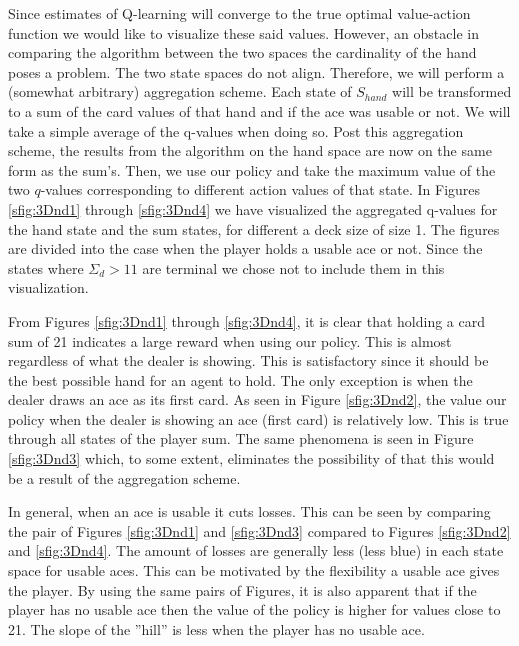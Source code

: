 Since estimates of Q-learning will converge to the true optimal value-action function we would like to visualize these said values. However, an obstacle in comparing the algorithm between the two spaces the cardinality of the hand poses a problem. The two state spaces do not align. Therefore, we will perform a (somewhat arbitrary) aggregation scheme. Each state of $S_{hand}$ will be transformed to a sum of the card values of that hand and if the ace was usable or not. We will take a simple average of the q-values when doing so. Post this aggregation scheme, the results from the algorithm on the hand space are now on the same form as the sum's. Then, we use our policy and take the maximum value of the two $q$-values corresponding to different action values of that state. In Figures \ref{sfig:3Dnd1} through \ref{sfig:3Dnd4} we have visualized the aggregated q-values for the hand state and the sum states, for different a deck size of size 1. The figures are divided into the case when the player holds a usable ace or not. Since the states where $\Sigma_d > 11$ are terminal we chose not to include them in this visualization.

From Figures  \ref{sfig:3Dnd1} through \ref{sfig:3Dnd4}, it is clear that holding a card sum of 21 indicates a large reward when using our policy. This is almost regardless of what the dealer is showing. This is satisfactory since it should be the best possible hand for an agent to hold.  The only exception is when the dealer draws an ace as its first card. As seen in Figure \ref{sfig:3Dnd2}, the value our policy when the dealer is showing an ace (first card) is relatively low. This is true through all states of the player sum. The same phenomena is seen in Figure \ref{sfig:3Dnd3} which, to some extent, eliminates the possibility of that this would be a result of the aggregation scheme. 

In general, when an ace is usable it cuts losses. This can be seen by comparing the pair of Figures \ref{sfig:3Dnd1} and \ref{sfig:3Dnd3} compared to Figures \ref{sfig:3Dnd2} and \ref{sfig:3Dnd4}. The amount of losses are generally less (less blue) in each state space for usable aces. This can be motivated by the flexibility a usable ace gives the player. By using the same pairs of Figures, it is also apparent that if the player has no usable ace then the value of the policy is higher for values close to 21. The slope of the ''hill'' is less when the player has no usable ace. 

